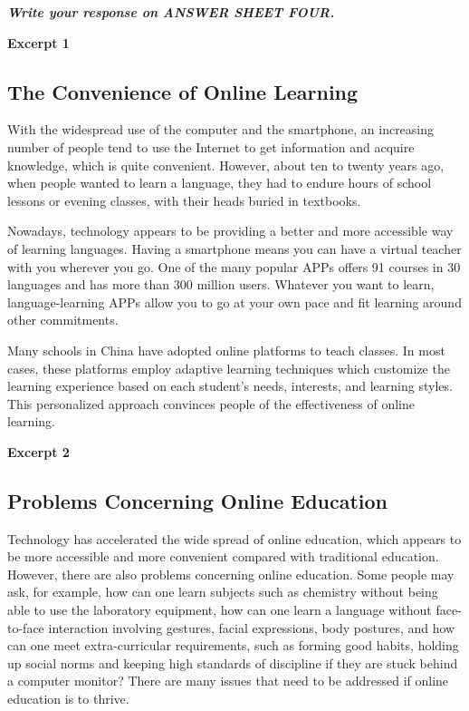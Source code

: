 \documentclass[UTF8,11pt]{ctexart}
\begin{document}
\textbf{\textit{Write your response on ANSWER SHEET FOUR.}}


\textbf{Excerpt 1}


\subsection*{\textbf{The Convenience of Online Learning}}


With the widespread use of the computer and the smartphone, an increasing number of people tend to use the Internet to get information and acquire knowledge, which is quite convenient. However, about ten to twenty years ago, when people wanted to learn a language, they had to endure hours of school lessons or evening classes, with their heads buried in textbooks.


Nowadays, technology appears to be providing a better and more accessible way of learning languages. Having a smartphone means you can have a virtual teacher with you wherever you go. One of the many popular APPs offers 91 courses in 30 languages and has more than 300 million users. Whatever you want to learn, language-learning APPs allow you to go at your own pace and fit learning around other commitments.


Many schools in China have adopted online platforms to teach classes. In most cases, these platforms employ adaptive learning techniques which customize the learning experience based on each student’s needs, interests, and learning styles. This personalized approach convinces people of the effectiveness of online learning.


\textbf{Excerpt 2}


\subsection*{\textbf{Problems Concerning Online Education}}


Technology has accelerated the wide spread of online education, which appears to be more accessible and more convenient compared with traditional education. However, there are also problems concerning online education. Some people may ask, for example, how can one learn subjects such as chemistry without being able to use the laboratory equipment, how can one learn a language without face-to-face interaction involving gestures, facial expressions, body postures, and how can one meet extra-curricular requirements, such as forming good habits, holding up social norms and keeping high standards of discipline if they are stuck behind a computer monitor? There are many issues that need to be addressed if online education is to thrive.
\end{document}
